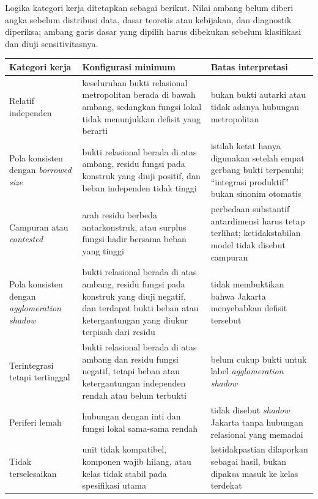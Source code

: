 \documentclass[11pt,a4paper,oneside,openany,indonesian]{report}
\begin{document}
Logika kategori kerja ditetapkan sebagai berikut. Nilai ambang belum
diberi angka sebelum distribusi data, dasar teoretis atau kebijakan, dan
diagnostik diperiksa; ambang garis dasar yang dipilih harus dibekukan
sebelum klasifikasi dan diuji sensitivitasnya.

{\def\LTcaptype{none} %
\begin{longtable}[]{@{}
  >{\raggedright\arraybackslash}p{}
  >{\raggedright\arraybackslash}p{}
  >{\raggedright\arraybackslash}p{}@{}}
\toprule\noalign{}
\begin{minipage}[b]{\linewidth}\raggedright
Kategori kerja
\end{minipage} & \begin{minipage}[b]{\linewidth}\raggedright
Konfigurasi minimum
\end{minipage} & \begin{minipage}[b]{\linewidth}\raggedright
Batas interpretasi
\end{minipage} \\
\midrule\noalign{}
\endhead
\bottomrule\noalign{}
\endlastfoot
Relatif independen & keseluruhan bukti relasional metropolitan berada
di bawah ambang, sedangkan fungsi lokal tidak menunjukkan defisit yang berarti
& bukan bukti autarki atau tidak adanya hubungan metropolitan \\
Pola konsisten dengan \emph{borrowed size} & bukti relasional berada di
atas ambang, residu fungsi pada konstruk yang diuji positif, dan beban
independen tidak tinggi &
istilah ketat hanya digunakan setelah empat gerbang bukti terpenuhi;
``integrasi produktif'' bukan sinonim otomatis \\
Campuran atau \emph{contested} & arah residu berbeda antarkonstruk,
atau surplus fungsi hadir bersama beban yang tinggi & perbedaan substantif
antardimensi harus tetap terlihat; ketidakstabilan model tidak disebut
campuran \\
Pola konsisten dengan \emph{agglomeration shadow} & bukti relasional
berada di atas ambang, residu fungsi pada konstruk yang diuji negatif,
dan terdapat bukti beban atau ketergantungan yang diukur terpisah dari
residu & tidak membuktikan bahwa Jakarta menyebabkan defisit tersebut \\
Terintegrasi tetapi tertinggal & bukti relasional berada di atas ambang
dan residu fungsi negatif, tetapi beban atau ketergantungan independen
rendah atau belum terbukti & belum cukup bukti untuk label
\emph{agglomeration shadow} \\
Periferi lemah & hubungan dengan inti dan fungsi lokal sama-sama rendah
& tidak disebut \emph{shadow} Jakarta tanpa hubungan relasional yang
memadai \\
Tidak terselesaikan & unit tidak kompatibel, komponen wajib hilang, atau
kelas tidak stabil pada spesifikasi utama & ketidakpastian dilaporkan
sebagai hasil, bukan dipaksa masuk ke kelas terdekat \\
\end{longtable}
}
\end{document}

